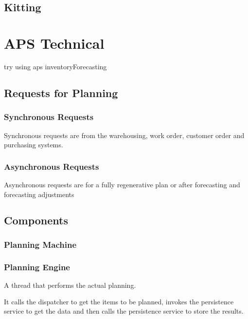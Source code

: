 \documentclass[letterpaper,10pt,english]{sphinxmanual}
\begin{document}
\section{Kitting}
\label{APS/ApsFeatures:kitting}

\chapter{APS Technical}
\label{APS/ApsTechnical:aps-technical}\label{APS/ApsTechnical::doc}
try using aps inventoryForecasting


\section{Requests for Planning}
\label{APS/ApsTechnical:requests-for-planning}

\subsection{Synchronous Requests}
\label{APS/ApsTechnical:synchronous-requests}
Synchronous requests are from the warehousing, work order, customer order
and purchasing systems.


\subsection{Asynchronous Requests}
\label{APS/ApsTechnical:asynchronous-requests}
Asynchronous requests are for a fully regenerative plan or after
forecasting and forecasting adjustments


\section{Components}
\label{APS/ApsTechnical:components}

\subsection{Planning Machine}
\label{APS/ApsTechnical:planning-machine}

\subsection{Planning Engine}
\label{APS/ApsTechnical:planning-engine}
A thread that performs the actual planning.

It calls the dispatcher to get the items to be planned,
invokes the persistence service to get the data and then
calls the persistence service to store the results.
\end{document}
